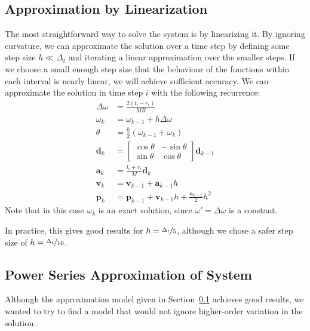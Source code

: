 \documentclass{report}
\begin{document}
\subsection{Approximation by Linearization} \label{sec:linearapprox}
The most straightforward way to solve the system is by linearizing it. By ignoring
curvature, we can approximate the solution over a time step by defining some step size $h \ll \Delta_t$
and iterating a linear approximation over the smaller steps.
If we choose a small enough step size that the behaviour of the
functions within each interval is nearly linear, we will achieve sufficient accuracy. We can approximate
the solution in time step $i$ with the following recurrence:
\begin{align*}
    \Delta\omega &= \frac{2(l_i - r_i)}{MR} \\
    \omega_k &= \omega_{k-1} + h \Delta\omega \\
    \theta &= \frac{h}{2} (\omega_{k-1} + \omega_k) \\
    \mathbf{d}_k &= \begin{bmatrix}\cos \theta & -\sin \theta \\ \sin \theta & \cos \theta\end{bmatrix} \mathbf{d}_{k-1} \\
    \mathbf{a}_k &= \frac{l_i + r_i}{M} \mathbf{d}_{k} \\
    \mathbf{v}_k &= \mathbf{v}_{k-1} + \mathbf{a}_{k-1} h \\
    \mathbf{p}_k &= \mathbf{p}_{k-1} + \mathbf{v}_{k-1} h + \frac{\mathbf{a}_{k-1}}{2} h^2
\end{align*}
Note that in this case $\omega_k$ is an exact solution, since $\omega' = \Delta\omega$ is a constant.

In practice, this gives good results for $h = \nicefrac{\Delta_t}{5}$, although we chose a
safer step size of $h = \nicefrac{\Delta_t}{10}$.


\subsection{Power Series Approximation of System}
Although the approximation model given in Section~\ref{sec:linearapprox}
achieves good results, we wanted to try to find a model that would not ignore higher-order
variation in the solution.
\end{document}
